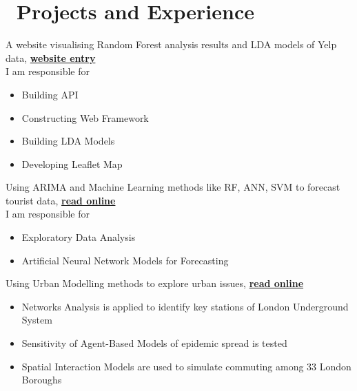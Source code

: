 \documentclass{resume}
\begin{document}
\section{\faUsers\ Projects and Experience}
A website visualising Random Forest analysis results and LDA models of Yelp data, \href{http://selftalkroom.com/}{\textbf{website entry}}
\\I am responsible for
\begin{itemize}
	\item Building API
	\item Constructing Web Framework
	\item Building LDA Models
	\item Developing Leaflet Map
\end{itemize}

Using ARIMA and Machine Learning methods like RF, ANN, SVM to forecast tourist data, \href{https://github.com/buyuhuang/spatio-temporal-data-mining/blob/master/stdm-report/main.pdf}{\textbf{read online}}
\\I am responsible for
\begin{itemize}
	\item Exploratory Data Analysis
	\item Artificial Neural Network Models for Forecasting
\end{itemize}

Using Urban Modelling methods to explore urban issues, \href{https://github.com/buyuhuang/urban-simulation/blob/master/urban-simulation-report/main.pdf}{\textbf{read online}}
\begin{itemize}
	\item Networks Analysis is applied to identify key stations of London Underground System
	\item Sensitivity of Agent-Based Models of epidemic spread is tested
	\item Spatial Interaction Models are used to simulate commuting among 33 London Boroughs
\end{itemize}
\end{document}
